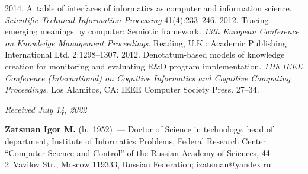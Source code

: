 \begin{multicols}{2}
{{\begin{thebibliography}{99}
 \columnbreak 
 
 2014. A~table of interfaces of informatics as computer and information science. 
\textit{Scientific Technical Information Processing} 41(4):233--246.
 2012. Tracing emerging meanings by computer: Semiotic framework. \textit{13th 
European Conference on Knowledge Management Proceedings}. Reading, U.K.: Academic Publishing 
International Ltd. 2:1298--1307.
 2012. Denotatum-based models of knowledge creation for monitoring and evaluating 
R\&D program implementation. \textit{11th IEEE Conference (International) on Cognitive Informatics 
and Cognitive Computing Proceedings}. Los Alamitos, CA: IEEE Computer Society Press. 27--34.
\end{thebibliography}

 }
 }

\end{multicols}

\vspace*{-6pt}

\hfill{\small\textit{Received July 14, 2022}}


\Contrl

\noindent
\textbf{Zatsman Igor M.} (b.\ 1952)~--- Doctor of Science in technology, head of department, Institute 
of Informatics Problems, Federal Research Center ``Computer Science and Control'' of the Russian 
Academy of Sciences, 44-2~Vavilov Str., Moscow 119333, Russian Federation; 
\mbox{izatsman@yandex.ru}

     
\label{end\stat}

\renewcommand{\bibname}{\protect\rm Литература}    